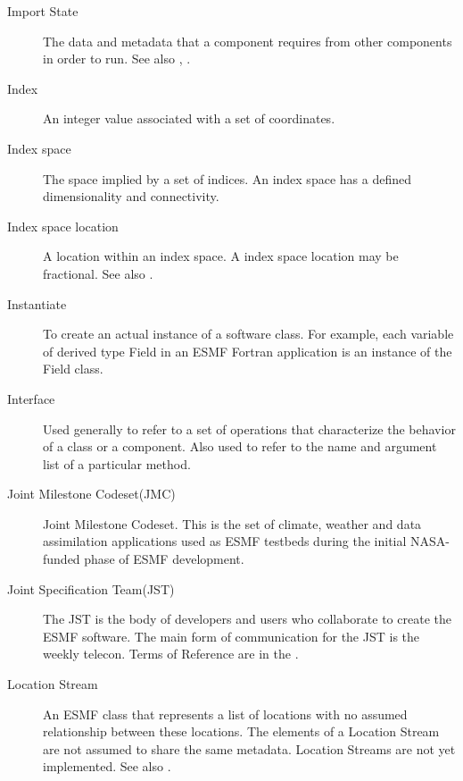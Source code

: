 \begin{description}
\label{glos:ImportState} 
\item[Import State] 
  The data and metadata 
  that a component requires from other components in order to run.  
  See also , .

\label{glos:Index} 
\item[Index] 
  An integer value associated with a set of coordinates.

\label{glos:IndexSpace} 
\item[Index space] 
  The space implied 
  by a set of indices.  An index space has a defined dimensionality and 
  connectivity.

\label{glos:IndexSpaceLoc} 
\item[Index space location] 
  A location within an index space.  A index space location may be fractional.
  See also .

\label{glos:Instantiate}
\item[Instantiate] 
  To create an actual instance of a software class.  For example, each 
  variable of derived type Field in an ESMF Fortran application is an 
  instance of the Field class.

\label{glos:Interface}
\item[Interface] 
  Used generally to refer to a set of operations that characterize 
  the behavior of a class or a component.  Also used to refer to the
  name and argument list of a particular method.

\label{glos:JMC} 
\item[Joint Milestone Codeset(JMC)] 
  Joint Milestone Codeset.  This is the set of climate, weather and
  data assimilation applications used as ESMF testbeds 
  during the initial NASA-funded phase of ESMF development.

\label{glos:JST}
\item[Joint Specification Team(JST)]
  The JST is the body of developers and users who collaborate
  to create the ESMF software.  The main form of communication for 
  the JST is the weekly telecon.  Terms of Reference are in the .

\label{glos:LocStream} 
\item[Location Stream] 
  An ESMF class that represents
  a list of locations with no assumed relationship between these locations.  
  The elements of a Location Stream are not assumed to share the same 
  metadata. Location Streams are not yet implemented.
  See also .


\end{description}
